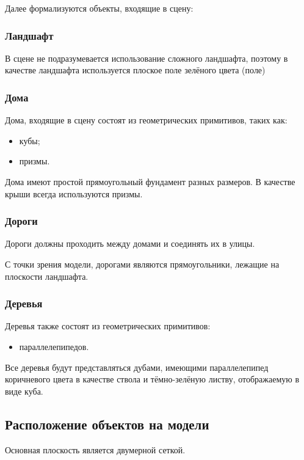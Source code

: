 Далее формализуются объекты, входящие в сцену:

\subsubsection*{Ландшафт}

В сцене не подразумевается использование сложного ландшафта, поэтому в качестве ландшафта используется плоское поле зелёного цвета (поле)

\subsubsection*{Дома}

Дома, входящие в сцену состоят из геометрических примитивов, таких как:
\begin{itemize}
    \item кубы;
    \item призмы.
\end{itemize}

Дома имеют простой прямоугольный фундамент разных размеров. В качестве крыши всегда используются призмы.

\subsubsection*{Дороги}

Дороги должны проходить между домами и соединять их в улицы. 

С точки зрения модели, дорогами являются прямоугольники, лежащие на плоскости ландшафта.

\subsubsection*{Деревья}

Деревья также состоят из геометрических примитивов:
\begin{itemize}
    \item параллелепипедов.
\end{itemize}

Все деревья будут представляться дубами, имеющими параллелепипед коричневого цвета в качестве ствола и тёмно-зелёную листву, отображаемую в виде куба.

\subsection*{Расположение объектов на модели}

Основная плоскость является двумерной сеткой.

